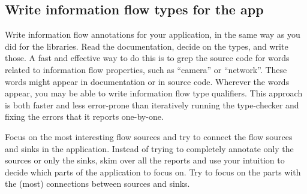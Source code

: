 %
%
%
%
%
%
%
%


\subsection{Write information flow types for the app\label{flow-task-annotate-app}}

Write information flow annotations for your application, in the same way as
you did for the libraries.  Read the documentation, decide on the types,
and write those.  A fast and effective way to do this is to grep the source
code for words related to information flow properties, such as ``camera''
or ``network''.  These words might appear in documentation or in source
code.  Wherever the words appear, you may be able to write information flow
type qualifiers.  This approach is both faster and less error-prone than
iteratively running the type-checker and fixing the errors that it reports
one-by-one.



Focus on the most interesting flow sources and try to connect the flow
sources and sinks in the application. Instead of trying to completely
annotate only the sources or only the sinks, skim over all the reports
and use your intuition to decide which parts of the application to
focus on. Try to focus on the parts with the (most) connections
between sources and sinks.

